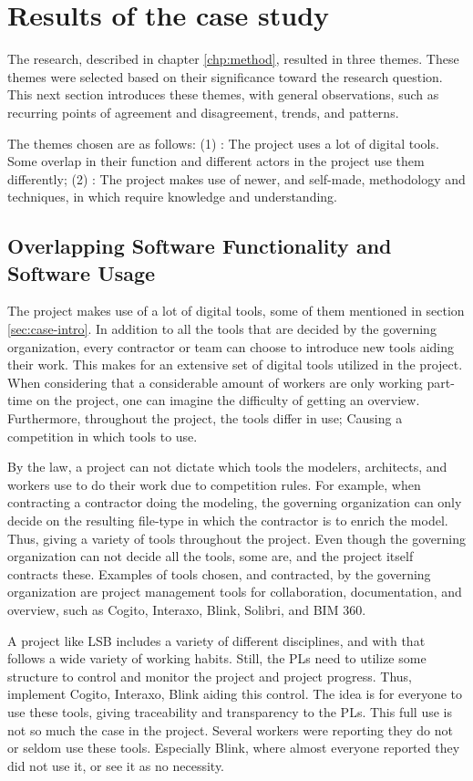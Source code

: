 \section{Results of the case study}
The research, described in chapter \ref{chp:method}, resulted in three themes. These themes were selected based on their significance toward the research question. This next section introduces these themes, with general observations, such as recurring points of agreement and disagreement, trends, and patterns. 

The themes chosen are as follows: (1) : The project uses a lot of digital tools. Some overlap in their function and different actors in the project use them differently; (2) : The project makes use of newer, and self-made, methodology and techniques, in which require knowledge and understanding.

\subsection{Overlapping Software Functionality and Software Usage} \label{sec:unmitigated}
The project makes use of a lot of digital tools, some of them mentioned in section \ref{sec:case-intro}. In addition to all the tools that are decided by the governing organization, every contractor or team can choose to introduce new tools aiding their work. This makes for an extensive set of digital tools utilized in the project. When considering that a considerable amount of workers are only working part-time on the project, one can imagine the difficulty of getting an overview. Furthermore, throughout the project, the tools differ in use; Causing a competition in which tools to use.

By the law, a project can not dictate which tools the modelers, architects, and workers use to do their work due to competition rules. For example, when contracting a contractor doing the modeling, the governing organization can only decide on the resulting file-type in which the contractor is to enrich the model. Thus, giving a variety of tools throughout the project. Even though the governing organization can not decide all the tools, some are, and the project itself contracts these. Examples of tools chosen, and contracted, by the governing organization are project management tools for collaboration, documentation, and overview, such as Cogito, Interaxo, Blink, Solibri, and BIM 360.

A project like LSB includes a variety of different disciplines, and with that follows a wide variety of working habits. Still, the PLs need to utilize some structure to control and monitor the project and project progress. Thus, implement Cogito, Interaxo, Blink aiding this control. The idea is for everyone to use these tools, giving traceability and transparency to the PLs. This full use is not so much the case in the project. Several workers were reporting they do not or seldom use these tools. Especially Blink, where almost everyone reported they did not use it, or see it as no necessity. 

